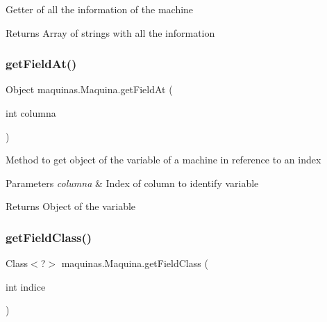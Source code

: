 Getter of all the information of the machine

\begin{DoxyReturn}{Returns}
Array of strings with all the information 
\end{DoxyReturn}
\mbox{\label{classmaquinas_1_1_maquina_ab9e0a71d979ac6b404b2b92697d90bed}} 
\subsubsection{\texorpdfstring{get\+Field\+At()}{getFieldAt()}}
{\footnotesize\ttfamily Object maquinas.\+Maquina.\+get\+Field\+At (\begin{DoxyParamCaption}\item[{int}]{columna }\end{DoxyParamCaption})\hspace{0.3cm}{\ttfamily [inline]}}

Method to get object of the variable of a machine in reference to an index


\begin{DoxyParams}{Parameters}
{\em columna} & Index of column to identify variable \\
\hline
\end{DoxyParams}
\begin{DoxyReturn}{Returns}
Object of the variable 
\end{DoxyReturn}
\mbox{\label{classmaquinas_1_1_maquina_ade3b0837e2f5242909de159b98c3f6a1}} 
\subsubsection{\texorpdfstring{get\+Field\+Class()}{getFieldClass()}}
{\footnotesize\ttfamily Class$<$?$>$ maquinas.\+Maquina.\+get\+Field\+Class (\begin{DoxyParamCaption}\item[{int}]{indice }\end{DoxyParamCaption})\hspace{0.3cm}{\ttfamily [inline]}}

